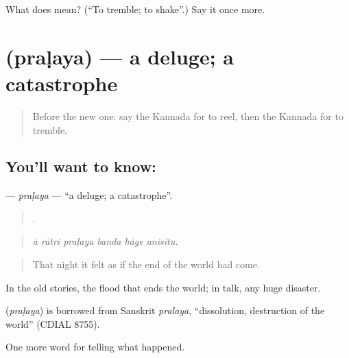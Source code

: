 \begin{tcolorbox}[breakable,colback=teal!4,colframe=teal!35!black,title={Before you move on}]
What does  mean? (\textquotedblleft{}To tremble; to shake\textquotedblright{}.) Say it once more.
\end{tcolorbox}
\section[\texorpdfstring{\kn{ಪ್ರಳಯ} (praḷaya)}{ಪ್ರಳಯ (praḷaya)}]{ (praḷaya) — a deluge; a catastrophe}

\label{lesson:KA-C346-pralaya}



\begin{quote}
Before the new one: say the Kannada for to reel, then the Kannada for to tremble.
\end{quote}

\subsection*{You'll want to know: }
\textbf{} — \emph{praḷaya} — \textquotedblleft{}a deluge; a catastrophe\textquotedblright{}.

\begin{quote}
     .
\end{quote}

\begin{quote}
\emph{ā rātri praḷaya banda hāge anisitu.}
\end{quote}

\begin{quote}
That night it felt as if the end of the world had come.
\end{quote}

In the old stories, the flood that ends the world; in talk, any huge disaster.

\begin{cousinweb}
\textbf{} (\emph{praḷaya}) is borrowed from Sanskrit \emph{pralaya}, \textquotedblleft{}dissolution, destruction of the world\textquotedblright{} (CDIAL 8755).
\end{cousinweb}

\begin{grammarlens}[title={What you've built}]
One more word for telling what happened.
\end{grammarlens}

